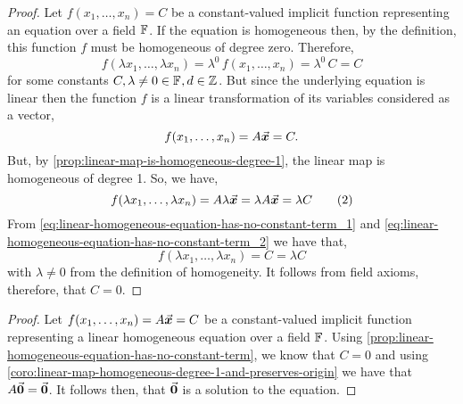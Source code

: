 \documentclass[../MathsNotesBase.tex]{subfiles}
\begin{document}
{		\bigskip
		\begin{tcolorbox}[breakable,enhanced jigsaw,colframe=white,colback=white,boxrule=0pt,arc=0pt,left=0pt,right=0pt,top=0pt,bottom=0pt]
			\begin{proof}
				Let ${ f(x_1,\dots,x_n) = C }$ be a constant-valued implicit function representing an equation over a field $\mathbb{F}^{}$. If the equation is homogeneous then, by the definition, this function $f$ must be homogeneous of degree zero. Therefore,
				\begin{equation} f(\lambda x_1,\dots,\lambda x_n) = \lambda^0 \, f(x_1,\dots,x_n) = \lambda^0 \, C = C  \tag{1}
					\label{eq:linear-homogeneous-equation-has-no-constant-term_1} 
				\end{equation}
				for some constants ${ C, \lambda \neq 0 \in \mathbb{F}^{}, d \in \mathbb{Z}^{} }$. But since the underlying equation is linear then the function $f$ is a linear transformation of its variables considered as a vector,
				\[ f(x_1,\dots,x_n) = A\vec{\bm{x}} = C. \]
				But, by \autoref{prop:linear-map-is-homogeneous-degree-1}, the linear map is homogeneous of degree 1. So, we have,
				\begin{equation} f(\lambda x_1,\dots,\lambda x_n) = A\lambda\vec{\bm{x}} = \lambda A\vec{\bm{x}} = \lambda C \tag{2} 
					\label{eq:linear-homogeneous-equation-has-no-constant-term_2}
				\end{equation}
				From \eqref{eq:linear-homogeneous-equation-has-no-constant-term_1} and \eqref{eq:linear-homogeneous-equation-has-no-constant-term_2} we have that,
				\[ f(\lambda x_1,\dots,\lambda x_n) = C = \lambda C \]
				with ${ \lambda \neq 0 }$ from the definition of homogeneity. It follows from field axioms, therefore, that ${ C = 0 }$.
			\end{proof}
		\end{tcolorbox}
	
		\bigskip
		\begin{tcolorbox}[breakable,enhanced jigsaw,colframe=white,colback=white,boxrule=0pt,arc=0pt,left=0pt,right=0pt,top=0pt,bottom=0pt]
			\begin{proof}
				Let ${ f(x_1,\dots,x_n) = A\vec{\bm{x}} = C }$ be a constant-valued implicit function representing a linear homogeneous equation over a field $\mathbb{F}^{}$. Using \autoref{prop:linear-homogeneous-equation-has-no-constant-term}, we know that ${ C = 0 }$ and using \autoref{coro:linear-map-homogeneous-degree-1-and-preserves-origin} we have that ${ A\vec{\bm{0}} = \vec{\bm{0}} }$. It follows then, that $\vec{\bm{0}}$ is a solution to the equation.
			\end{proof}
		\end{tcolorbox}
		
}
\end{document}
